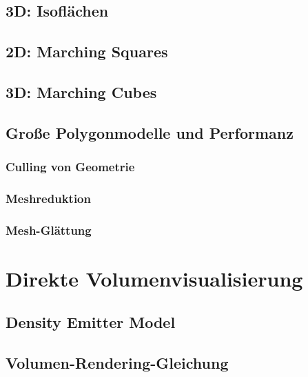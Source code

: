 \documentclass[a4paper, 11pt, accentcolor = tud3b]{tudreport}
\begin{document}
			\subsection{3D: Isoflächen} %

			\subsection{2D: Marching Squares} %

			\subsection{3D: Marching Cubes} %

			\subsection{Große Polygonmodelle und Performanz} %

				\subsubsection{Culling von Geometrie} %

				\subsubsection{Meshreduktion} %

				\subsubsection{Mesh-Glättung} %

		\section{Direkte Volumenvisualisierung} %

			\subsection{Density Emitter Model} %

			\subsection{Volumen-Rendering-Gleichung} %
\end{document}
